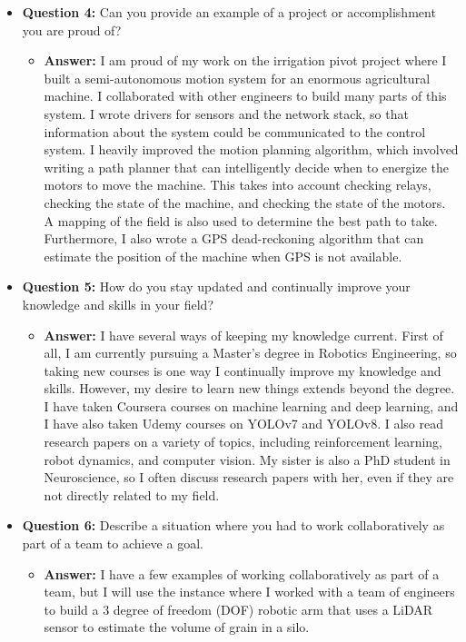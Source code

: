\documentclass{article}
\begin{document}
\begin{itemize}
    \item \textbf{Question 4:} Can you provide an example of a project or accomplishment you are proud of?
    \begin{itemize}
        \item \textbf{Answer:} I am proud of my work on the irrigation pivot project
        where I built a semi-autonomous motion system for an enormous agricultural
        machine. I collaborated with other engineers to build many parts of this
        system. I wrote drivers for sensors and the network stack, so that 
        information about the system could be communicated to the control
        system. I heavily improved the motion planning algorithm, which
        involved writing a path planner that can intelligently decide
        when to energize the
        motors to move the machine. This takes into account checking
        relays, checking the state of the machine, and checking the
        state of the motors. A mapping of the field is also used to
        determine the best path to take.
        Furthermore, I also wrote a GPS dead-reckoning algorithm
        that can estimate the position of the machine when GPS is not available.
    \end{itemize}
    
    \item \textbf{Question 5:} How do you stay updated and continually improve your knowledge and skills in your field?
    \begin{itemize}
        \item \textbf{Answer:} I have several ways of keeping my knowledge current. First of all,
        I am currently pursuing a Master's degree in Robotics Engineering, so taking new courses
        is one way I continually improve my knowledge and skills. However, my 
        desire to learn new things extends beyond the degree. I have
        taken Coursera courses on machine learning and deep learning, and I
        have also taken Udemy courses on YOLOv7 and YOLOv8. I also read
        research papers on a variety of topics, including reinforcement learning,
        robot dynamics, and computer vision. My sister is also a PhD student
        in Neuroscience, so I often discuss research papers with her, even
        if they are not directly related to my field.\\
    \end{itemize}
    
    \item \textbf{Question 6:} Describe a situation where you had to work collaboratively as part of a team to achieve a goal.
    \begin{itemize}
        \item \textbf{Answer:} I have a few examples of working collaboratively as part of a team, but I 
        will use the instance where I worked with a team of engineers to build a 3 degree of
        freedom (DOF) robotic arm that uses a LiDAR sensor to estimate the volume of grain in a silo.\\


\end{itemize}
\end{itemize}
\end{document}
